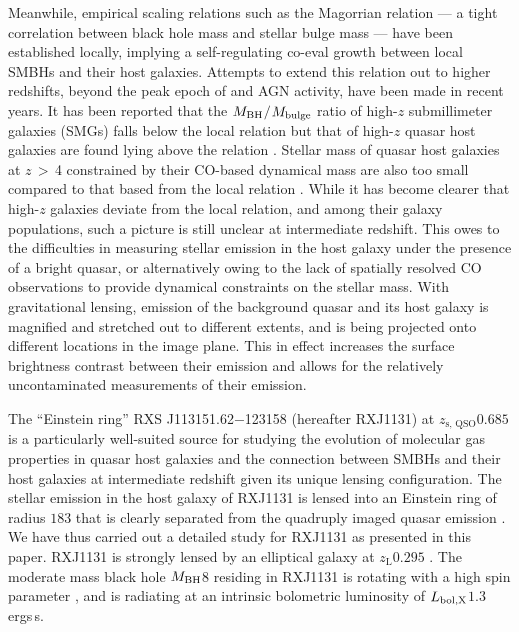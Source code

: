 \documentclass[]{emulateapj}
\begin{document}
Meanwhile, empirical scaling relations such as the Magorrian relation \citep{Magorrian98a}
--- a tight correlation between black hole mass and stellar bulge mass ---
have been established locally, implying a self-regulating co-eval growth between local SMBHs and their host galaxies.
Attempts to extend this relation out to higher redshifts, beyond the peak epoch 
of \SF and AGN activity, have been made in recent years.
It has been reported that the $M_{\rm BH}$$/$$M_{\rm bulge}$ ratio of high-$z$ submillimeter galaxies (SMGs) falls below 
the local relation \citep[\eg][]{Borys05a,Alexander08a} but that of high-$z$ quasar host galaxies are found 
lying above 
the relation \citep[\eg][]{McLure06a,Peng06a}.
Stellar mass of quasar host galaxies at $z$\,$>$\,4 constrained by their CO-based dynamical mass 
are also too small compared to that based from the local relation \citep{Walter04a, Riechers08a,Coppin08a}. 
While it has become clearer that high-$z$ galaxies deviate from the local relation, and among their galaxy populations, 
such a picture is still unclear  at intermediate redshift.
This owes to the difficulties in measuring stellar emission in the host galaxy under the presence of a bright quasar, or alternatively
owing to the lack of spatially resolved CO observations to provide dynamical constraints on the stellar mass. 
With gravitational lensing, emission of the background quasar and its host galaxy 
is magnified and stretched out to different extents, and is being projected onto different locations in the image plane.
This in effect increases the surface brightness contrast between their emission and allows for the
relatively uncontaminated measurements of their emission. 

The ``Einstein ring'' RXS J113151.62$-$123158 (hereafter RXJ1131) 
at $z_\textrm{s, QSO}$\eq$0.685$ \citep[hereafter S03]{Sluse03a} is a particularly well-suited source for
studying the evolution of molecular gas properties in quasar host galaxies and the 
connection between SMBHs and their host galaxies at intermediate redshift
given its unique lensing configuration.
The stellar emission in the host galaxy of RXJ1131 is lensed into
an Einstein ring of radius $1$\farcs$83$
that is clearly separated from the quadruply imaged quasar emission \citep[hereafter C06]{Claeskens06a}.
We have thus carried out a detailed study for RXJ1131 as presented in this paper.
RXJ1131 is strongly lensed by an elliptical galaxy at $z_\textrm{L}$\eq$0.295$ .
The moderate mass black hole $M_{\rm BH}$\eq$8$\Msun \citep{Sluse12a} %
residing in RXJ1131 is rotating with a high spin parameter \citep[$a$\,$\sim$\,$0.9$;][]{Reis14a}, and
is radiating at an intrinsic bolometric luminosity of $L_{\rm bol, X}$\eq$1.3$\, ergs\,s\pmOne \citep{Pooley07a}.
\end{document}
